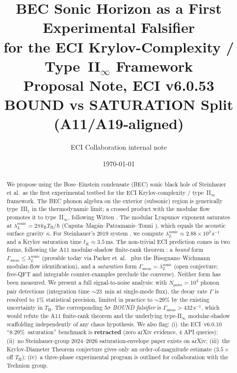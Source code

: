 \documentclass[12pt,a4paper]{article}
\title{\textbf{BEC Sonic Horizon as a First Experimental Falsifier\\
for the ECI Krylov-Complexity / Type~II$_\infty$ Framework}\\[0.5em]
\large Proposal Note, ECI v6.0.53\\[0.3em]
\normalsize BOUND vs SATURATION Split (A11/A19-aligned)}
\author{ECI Collaboration internal note\\}
\date{\today}
\renewcommand{\TH}{T_{\mathrm{H}}}
\newcommand{\lambdaL}{\lambda_L^{\mathrm{sonic}}}
\newcommand{\kB}{k_{\mathrm{B}}}
\begin{document}
\maketitle

\begin{abstract}
We propose using the Bose--Einstein condensate (BEC) sonic black hole of
Steinhauer et al.\ as the first experimental testbed for the ECI
Krylov-complexity / type~II$_\infty$ framework.
The BEC phonon algebra on the exterior (subsonic) region is generically
type~III$_1$ in the thermodynamic limit; a crossed product with the
modular flow promotes it to type~II$_\infty$, following Witten
\cite{witten2022}.
The modular Lyapunov exponent saturates at $\lambdaL = 2\pi \kB \TH /
\hbar$ (Caputa--Mag\'an--Patramanis--Tonni \cite{caputa2023}), which
equals the acoustic surface gravity $\kappa$.
For Steinhauer's 2019 system \cite{steinhauer2019}, we compute
$\lambdaL \approx 2.88 \times 10^2\,\mathrm{s}^{-1}$ and a
Krylov saturation time $t_K \approx 3.5\,\mathrm{ms}$.
The non-trivial ECI prediction comes in two forms, following the
A11 modular-shadow finite-rank theorem
\cite{eci_modular_shadow_summary}: a \emph{bound} form
$\Gamma_{\mathrm{meas}} \leq \lambdaL$ (provable today via Parker
et~al.\ \cite{parker2019} plus the Bisognano--Wichmann modular-flow
identification), and a \emph{saturation} form
$\Gamma_{\mathrm{meas}} = \lambdaL$ (open conjecture; free-QFT and
integrable counter-examples \cite{avdoshkin2019,camargo2022,sreeram2025}
preclude the converse).  Neither form has been measured.
We present a full signal-to-noise analysis: with $N_{\mathrm{pairs}}
= 10^4$ phonon pair detections (integration time $\sim 23$~min at
single-mode flux), the decay rate $\Gamma$ is resolved to $1\%$ statistical
precision, limited in practice to $\sim 29\%$ by the existing uncertainty
in $\TH$.  The corresponding 5$\sigma$ \emph{BOUND falsifier} is
$\Gamma_{\mathrm{meas}} > 432\,\mathrm{s}^{-1}$, which would refute
the A11 finite-rank theorem and the underlying type-II$_\infty$
modular-shadow scaffolding independently of any chaos hypothesis.
We also flag: (i)~the ECI~v6.0.10 ``8.29\%~saturation'' benchmark is
\textbf{retracted} (zero arXiv evidence, 4 API queries); (ii)~no Steinhauer-group
2024--2026 saturation-envelope paper exists on arXiv; (iii)~the
Krylov-Diameter Theorem conjecture gives only an order-of-magnitude
estimate ($3.5\times$ off $\TH$); (iv)~a three-phase experimental
program is outlined for collaboration with the Technion group.
\end{abstract}
\end{document}
